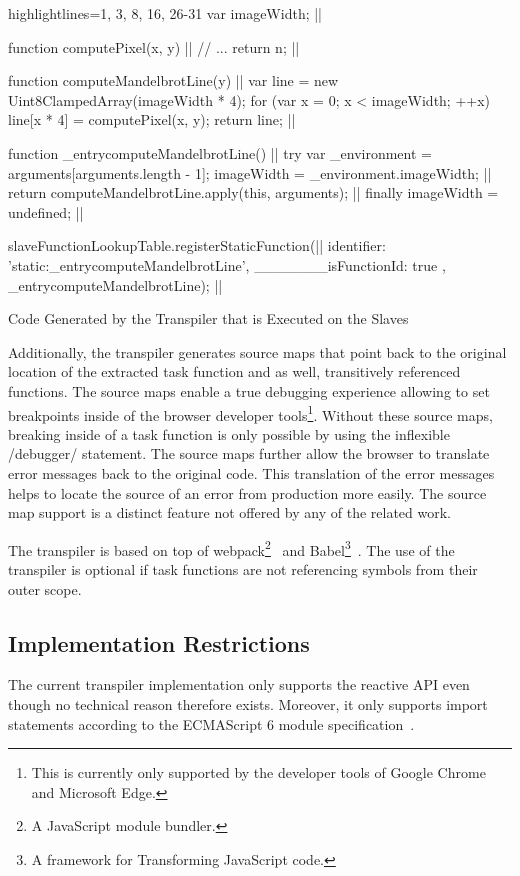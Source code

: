 \begin{listing}
\begin{javascriptcode*}{highlightlines={1, 3, 8, 16, 26-31}}
var imageWidth; |$\label{code:slave-image-width}$|

function computePixel(x, y) { |$\label{code:slave-compute-pixel-start}$|
	// ...
	return n;
}|$\label{code:slave-compute-pixel-end}$|

function computeMandelbrotLine(y) { |$\label{code:slave-task function-start}$|
	var line = new Uint8ClampedArray(imageWidth * 4);
	for (var x = 0; x < imageWidth; ++x) {
		line[x * 4] = computePixel(x, y);
	}
	return line;
}|$\label{code:slave-task function-end}$|
 
function _entrycomputeMandelbrotLine() { |$\label{code:slave-entry-function-start}$|
	try {
		var _environment = arguments[arguments.length - 1];
		imageWidth = _environment.imageWidth; |$\label{code:slave-init-variable}$|
		return computeMandelbrotLine.apply(this, arguments); |$\label{code:call-task-function}$|
	} finally {
		imageWidth = undefined;
	}
} |$\label{code:slave-entry-function-end}$|

slaveFunctionLookupTable.registerStaticFunction({|$\label{code:slave-register-function-start}$|
		identifier: 'static:_entrycomputeMandelbrotLine',
		_______isFunctionId: true
	}, _entrycomputeMandelbrotLine); |$\label{code:slave-register-function-end}$|
\end{javascriptcode*}
\caption{Code Generated by the Transpiler that is Executed on the Slaves}
\label{fig:transpiled-mandelbrot-slave}
\end{listing}

Additionally, the transpiler generates source maps that point back to the original location of the extracted task function and as well, transitively referenced functions. The source maps enable a true debugging experience allowing to set breakpoints inside of the browser developer tools\footnote{This is currently only supported by the developer tools of Google Chrome and Microsoft Edge.}. Without these source maps, breaking inside of a task function is only possible by using the inflexible \javascriptinline/debugger/ statement. The source maps further allow the browser to translate error messages back to the original code. This translation of the error messages helps to locate the source of an error from production more easily. The source map support is a distinct feature not offered by any of the related work.

The transpiler is based on top of webpack\footnote{A JavaScript module bundler.}~\cite{webpack} and Babel\footnote{A framework for Transforming JavaScript code.}~\cite{babel}. The use of the transpiler is optional if task functions are not referencing symbols from their outer scope.

\subsection{Implementation Restrictions}
The current transpiler implementation only supports the reactive API even though no technical reason therefore exists. Moreover, it only supports import statements according to the ECMAScript 6 module specification~\cite[Section 15.2]{ecmaScript2015}.
